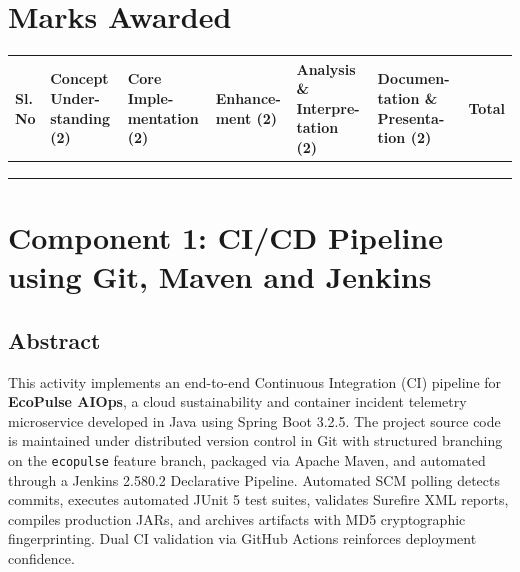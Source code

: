\documentclass[12pt,a4paper]{article}
\newcommand{\sizeTwelve}{\fontsize{12pt}{14.5pt}\selectfont}  %
\begin{document}
\newpage

\section*{Marks Awarded}

\vspace{0.3cm}

{\sizeTwelve
\setlength{\tabcolsep}{3pt}
\renewcommand{\arraystretch}{1.5}
\begin{longtable}{|>{\centering\arraybackslash}p{1.0cm}|>{\raggedright\arraybackslash}p{2.2cm}|>{\raggedright\arraybackslash}p{2.2cm}|>{\raggedright\arraybackslash}p{2.0cm}|>{\raggedright\arraybackslash}p{2.3cm}|>{\raggedright\arraybackslash}p{2.5cm}|>{\centering\arraybackslash}p{1.4cm}|}
\hline
\textbf{Sl. No} &
\textbf{Concept Under- standing (2)} &
\textbf{Core Imple- mentation (2)} &
\textbf{Enhance- ment (2)} &
\textbf{Analysis \& Interpre- tation (2)} &
\textbf{Documen- tation \& Presenta- tion (2)} &
\textbf{Total} \\
\hline
\parbox[c][1.1cm][c]{1.0cm}{} & & & & & & \\
\hline
\parbox[c][1.1cm][c]{1.0cm}{} & & & & & & \\
\hline
{} &
\parbox[c][1.1cm][c]{1.4cm}{\centering} \\
\hline
\end{longtable}
\par}

\newpage

\section*{Component 1: CI/CD Pipeline using Git, Maven and Jenkins}

\subsection*{Abstract}
This activity implements an end-to-end Continuous Integration (CI) pipeline for \textbf{EcoPulse AIOps}, a cloud sustainability and container incident telemetry microservice developed in Java using Spring Boot 3.2.5. The project source code is maintained under distributed version control in Git with structured branching on the \texttt{ecopulse} feature branch, packaged via Apache Maven, and automated through a Jenkins 2.580.2 Declarative Pipeline. Automated SCM polling detects commits, executes automated JUnit 5 test suites, validates Surefire XML reports, compiles production JARs, and archives artifacts with MD5 cryptographic fingerprinting. Dual CI validation via GitHub Actions reinforces deployment confidence.
\end{document}
